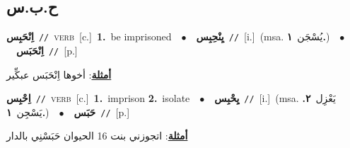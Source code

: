 \documentclass[10pt,a4paper,twoside]{article} %
\begin{document}
\begin{multicols}{2}
{{{\vspace{-3mm}
\subsection*{\color{blue}\foreignlanguage{arabic}{ح.ب.س}\color{blue}{}} 

{\setlength\topsep{0pt}\textbf{\foreignlanguage{arabic}{اِنْحَبِس}}\ {\color{gray}\texttt{//}\color{black}}\ \textsc{verb}\ [c.]\ \textbf{1.}~be imprisoned\ \ $\bullet$\ \ \setlength\topsep{0pt}\textbf{\foreignlanguage{arabic}{يِنْحِبِس}}\ {\color{gray}\texttt{//}\color{black}}\ [i.]\ \color{gray}(msa. \foreignlanguage{arabic}{يُسْجَن}~\foreignlanguage{arabic}{\textbf{١.}})\color{black}\ \ $\bullet$\ \ \setlength\topsep{0pt}\textbf{\foreignlanguage{arabic}{اِنْحَبَس}}\ {\color{gray}\texttt{//}\color{black}}\ [p.]\  \begin{flushright}\color{gray}\foreignlanguage{arabic}{\textbf{\underline{\foreignlanguage{arabic}{أمثلة}}}: أخوها اِنْحَبَس عبكِّير}\end{flushright}\color{black}} \vspace{2mm}

{\setlength\topsep{0pt}\textbf{\foreignlanguage{arabic}{اِحْبِس}}\ {\color{gray}\texttt{//}\color{black}}\ \textsc{verb}\ [c.]\ \textbf{1.}~imprison  \textbf{2.}~isolate\ \ $\bullet$\ \ \setlength\topsep{0pt}\textbf{\foreignlanguage{arabic}{يِحْبِس}}\ {\color{gray}\texttt{//}\color{black}}\ [i.]\ \color{gray}(msa. \foreignlanguage{arabic}{يَعْزِل}~\foreignlanguage{arabic}{\textbf{٢.}}  \foreignlanguage{arabic}{يَسْجِن}~\foreignlanguage{arabic}{\textbf{١.}})\color{black}\ \ $\bullet$\ \ \setlength\topsep{0pt}\textbf{\foreignlanguage{arabic}{حَبَس}}\ {\color{gray}\texttt{//}\color{black}}\ [p.]\  \begin{flushright}\color{gray}\foreignlanguage{arabic}{\textbf{\underline{\foreignlanguage{arabic}{أمثلة}}}: اتجوزني بنت 16 الحيوان حَبَسْنِي بالدار}\end{flushright}\color{black}} \vspace{2mm}

}}}
\end{multicols}
\end{document}
